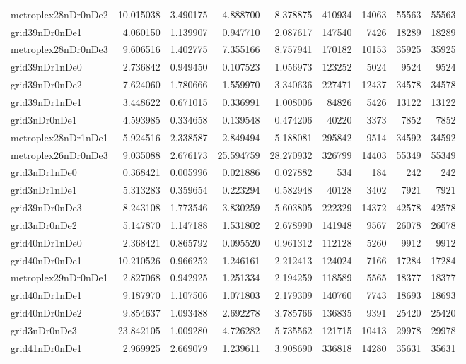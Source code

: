\begin{longtable}{|l|r|r|r|r|r|r|r|r|}
metroplex28nDr0nDe2 & 10.015038 & 3.490175 & 4.888700 & 8.378875 & 410934 & 14063 & 55563 & 55563 \\
grid39nDr0nDe1 & 4.060150 & 1.139907 & 0.947710 & 2.087617 & 147540 & 7426 & 18289 & 18289 \\
metroplex28nDr0nDe3 & 9.606516 & 1.402775 & 7.355166 & 8.757941 & 170182 & 10153 & 35925 & 35925 \\
grid39nDr1nDe0 & 2.736842 & 0.949450 & 0.107523 & 1.056973 & 123252 & 5024 & 9524 & 9524 \\
grid39nDr0nDe2 & 7.624060 & 1.780666 & 1.559970 & 3.340636 & 227471 & 12437 & 34578 & 34578 \\
grid39nDr1nDe1 & 3.448622 & 0.671015 & 0.336991 & 1.008006 & 84826 & 5426 & 13122 & 13122 \\
grid3nDr0nDe1 & 4.593985 & 0.334658 & 0.139548 & 0.474206 & 40220 & 3373 & 7852 & 7852 \\
metroplex28nDr1nDe1 & 5.924516 & 2.338587 & 2.849494 & 5.188081 & 295842 & 9514 & 34592 & 34592 \\
metroplex26nDr0nDe3 & 9.035088 & 2.676173 & 25.594759 & 28.270932 & 326799 & 14403 & 55349 & 55349 \\
grid3nDr1nDe0 & 0.368421 & 0.005996 & 0.021886 & 0.027882 & 534 & 184 & 242 & 242 \\
grid3nDr1nDe1 & 5.313283 & 0.359654 & 0.223294 & 0.582948 & 40128 & 3402 & 7921 & 7921 \\
grid39nDr0nDe3 & 8.243108 & 1.773546 & 3.830259 & 5.603805 & 222329 & 14372 & 42578 & 42578 \\
grid3nDr0nDe2 & 5.147870 & 1.147188 & 1.531802 & 2.678990 & 141948 & 9567 & 26078 & 26078 \\
grid40nDr1nDe0 & 2.368421 & 0.865792 & 0.095520 & 0.961312 & 112128 & 5260 & 9912 & 9912 \\
grid40nDr0nDe1 & 10.210526 & 0.966252 & 1.246161 & 2.212413 & 124024 & 7166 & 17284 & 17284 \\
metroplex29nDr0nDe1 & 2.827068 & 0.942925 & 1.251334 & 2.194259 & 118589 & 5565 & 18377 & 18377 \\
grid40nDr1nDe1 & 9.187970 & 1.107506 & 1.071803 & 2.179309 & 140760 & 7743 & 18693 & 18693 \\
grid40nDr0nDe2 & 9.854637 & 1.093488 & 2.692278 & 3.785766 & 136835 & 9391 & 25420 & 25420 \\
grid3nDr0nDe3 & 23.842105 & 1.009280 & 4.726282 & 5.735562 & 121715 & 10413 & 29978 & 29978 \\
grid41nDr0nDe1 & 2.969925 & 2.669079 & 1.239611 & 3.908690 & 336818 & 14280 & 35631 & 35631 \\

\end{longtable}
